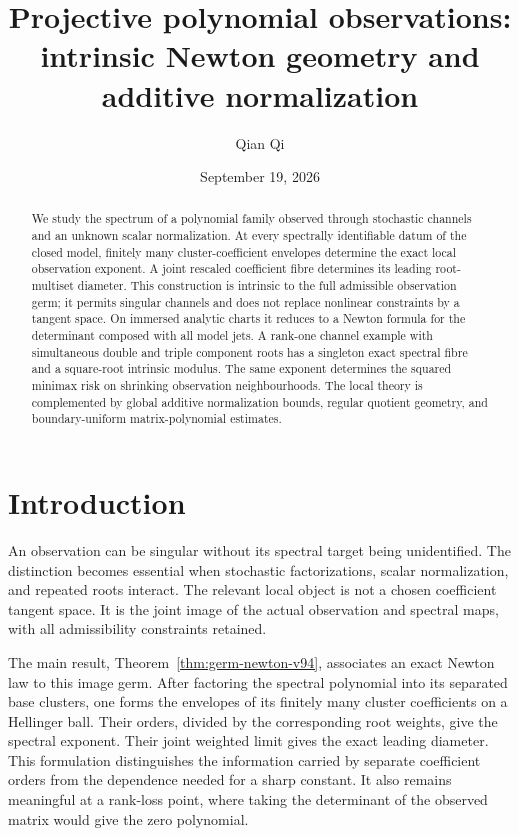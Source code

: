 \documentclass[11pt,reqno]{amsart}
\title[Intrinsic Newton geometry]{Projective polynomial observations:\\ intrinsic Newton geometry and additive normalization}
\author{Qian Qi}
\date{September 19, 2026}
\numberwithin{equation}{section}
\theoremstyle{definition}\newtheorem{definition}[theorem]{Definition}
\theoremstyle{remark}\newtheorem{remark}[theorem]{Remark}
\begin{document}
\begin{abstract}
We study the spectrum of a polynomial family observed through stochastic
channels and an unknown scalar normalization. At every spectrally
identifiable datum of the closed model, finitely many cluster-coefficient
envelopes determine the exact local observation exponent. A joint
rescaled coefficient fibre determines its leading root-multiset diameter.
This construction is intrinsic to the full admissible observation germ;
it permits singular channels and does not replace nonlinear constraints
by a tangent space. On immersed analytic charts it reduces to a Newton
formula for the determinant composed with all model jets. A rank-one
channel example with simultaneous double and triple component roots has
a singleton exact spectral fibre and a square-root intrinsic modulus.
The same exponent determines the squared minimax risk on shrinking
observation neighbourhoods. The local theory is complemented by global
additive normalization bounds, regular quotient geometry, and
boundary-uniform matrix-polynomial estimates.
\end{abstract}
\maketitle

\section{Introduction}
An observation can be singular without its spectral target being
unidentified. The distinction becomes essential when stochastic
factorizations, scalar normalization, and repeated roots interact.
The relevant local object is not a chosen coefficient tangent space.
It is the joint image of the actual observation and spectral maps,
with all admissibility constraints retained.

The main result, Theorem~\ref{thm:germ-newton-v94}, associates an
exact Newton law to this image germ. After factoring the spectral
polynomial into its separated base clusters, one forms the envelopes
of its finitely many cluster coefficients on a Hellinger ball. Their
orders, divided by the corresponding root weights, give the spectral
exponent. Their joint weighted limit gives the exact leading diameter.
This formulation distinguishes the information carried by separate
coefficient orders from the dependence needed for a sharp constant.
It also remains meaningful at a rank-loss point, where taking the
determinant of the observed matrix would give the zero polynomial.
\end{document}

